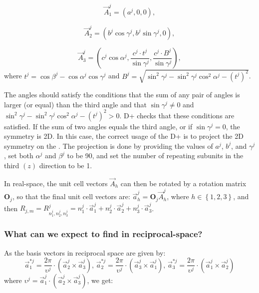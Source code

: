 \documentclass[../D+Manual.tex]{subfiles}
\begin{document}
\begin{equation*}
\vec{A}^{j}_{1}=(a^j,0,0),
\end{equation*}


\begin{equation*}
\vec{A}^{j}_{2}=\left(b^j\cos\gamma^j,b^j\sin\gamma^j,0\right),
\end{equation*}


\begin{equation*}
\vec{A}^{j}_{3}=\left(c^j\cos\alpha^j,\frac{c^j\cdot t^j}{\sin\gamma^j},\frac{c^j\cdot B^j}{\sin\gamma^j}\right),
\end{equation*}
where $t^j=\cos\beta^j-\cos\alpha^j\cos\gamma^j$ and  $B^j=\sqrt{\sin^{2}\gamma^j-\sin^{2}\gamma^j\cos^{2}\alpha^j-\left(t^j\right)^{2}}$. 

The angles should satisfy the conditions that the sum of any pair of angles is larger (or equal) than the third angle and that $\sin\gamma^j \neq 0$ and $\sin^{2}\gamma^j-\sin^{2}\gamma^j\cos^{2}\alpha^j-\left(t^j\right)^{2} > 0$.  D+ checks that these conditions are satisfied. If the sum of two angles equals the third angle, or if $\sin\gamma^j = 0$, the symmetry is 2D.
In this case, the correct usage of the D+ is to project the 2D symmetry on the . The projection is done by providing the values of $a^j$, $b^j$, and $\gamma^j$, set both $\alpha^j$ and $\beta^j$ to be 90, and set the number of repeating subunits in the third $(z)$ direction to be 1.

In real-space, the unit cell vectors $\vec{A}_{h}$ can then be rotated by a rotation matrix $\mathbf{O}_j$, so that the final unit cell vectors are: $\vec{a}_{h}^j=\mathbf{O}_j\vec{A}_{h}^{j}$, where $h\in\left\{ 1,2,3\right\}$, and then $R_{j,m}=R^j_{n^j_1,n^j_2,n^j_3}=n^j_1\cdot\vec{a}^j_1+n^j_2\cdot\vec{a}^j_2+n^j_3\cdot\vec{a}^j_3$. 



\subsubsection{What can we expect to find in reciprocal-space?}

 As the basis vectors in reciprocal space are given by:
\begin{equation*}
\vec{a}_{1}^{*j}=\frac{2\pi}{\upsilon ^j}\cdot\left(\vec{a}^j_2\times\vec{a}^j_3\right),\,  \vec{a}_{2}^{*j}=\frac{2\pi}{\upsilon ^j}\cdot\left(\vec{a}^j_3\times\vec{a}^j_1\right),\, \vec{a}_{3}^{*j}=\frac{2\pi}{\upsilon ^j}\cdot\left(\vec{a}^j_1\times\vec{a}^j_2\right) 
\end{equation*}
where $\upsilon ^j=\vec{a}^j_1\cdot\left(\vec{a}^j_2\times\vec{a}^j_3\right)$, we get:
\end{document}
